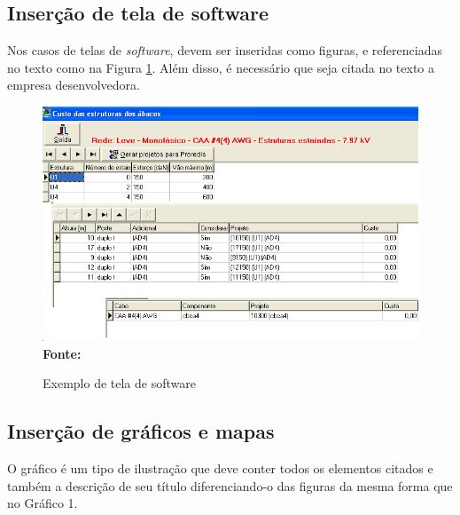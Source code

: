 \subsection{\esp Inserção de tela de software}

Nos casos de telas de \textit{software}, devem ser inseridas como figuras, e referenciadas no texto
como na Figura \ref{fig:tela1}. Além disso, é necessário que seja citada no texto a empresa desenvolvedora.

\begin{figure}[!ht]
	\centering	
	\caption[\hspace{0.1cm}Exemplo de tela de software.]{Exemplo de tela de software}
	  \vspace{-0.4cm}
	\includegraphics[width=.8\textwidth]{figuras/tela1.png}
	 \vspace{-0.3cm}
	\\\textbf{\footnotesize Fonte: \cite{tela1}}
	\label{fig:tela1}
\end{figure}

\subsection{\esp Inserção de gráficos e mapas}

O gráfico é um tipo de ilustração que deve conter todos os elementos citados e também a descrição de seu título
diferenciando-o das figuras da mesma forma que no Gráfico 1. 

